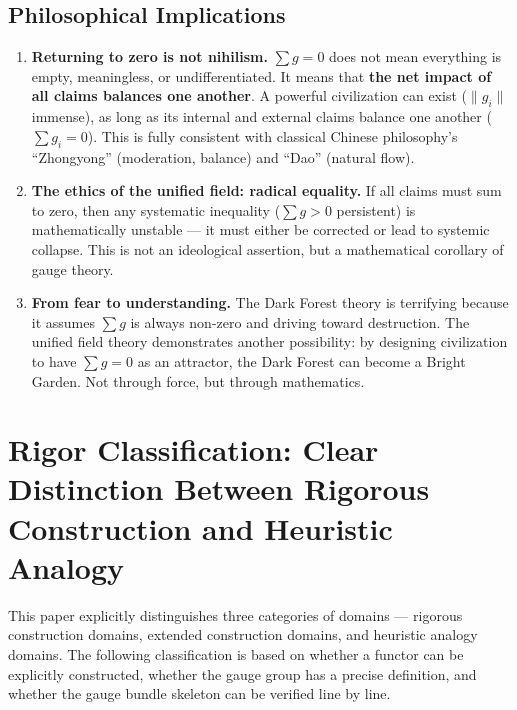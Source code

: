 \documentclass[12pt,a4paper]{article}
\theoremstyle{plain}
\theoremstyle{definition}
\begin{document}
\subsection{Philosophical Implications}

\begin{enumerate}[label=\textbf{Reflection \arabic*:}]

    \item \textbf{Returning to zero is not nihilism.} $\sum g = 0$ does not mean everything is empty,
    meaningless, or undifferentiated. It means that \textbf{the net impact of all claims balances one another}.
    A powerful civilization can exist ($\|g_i\|$ immense), as long as its internal and external
    claims balance one another ($\sum g_i = 0$). This is fully consistent with classical Chinese philosophy's
    ``Zhongyong'' (moderation, balance) and ``Dao'' (natural flow).

    \item \textbf{The ethics of the unified field: radical equality.} If all claims must
    sum to zero, then any systematic inequality ($\sum g > 0$ persistent) is mathematically
    unstable — it must either be corrected or lead to systemic collapse. This is not an ideological
    assertion, but a mathematical corollary of gauge theory.

    \item \textbf{From fear to understanding.} The Dark Forest theory is terrifying because
    it assumes $\sum g$ is always non-zero and driving toward destruction. The unified field theory demonstrates another
    possibility: by designing civilization to have $\sum g = 0$ as an attractor, the Dark Forest
    can become a Bright Garden. Not through force, but through mathematics.

\end{enumerate}

\newpage


\section{Rigor Classification: Clear Distinction Between Rigorous Construction and Heuristic Analogy}

This paper explicitly distinguishes three categories of domains — rigorous construction domains, extended construction domains, and heuristic analogy domains. The following classification is based on whether a functor can be explicitly constructed, whether the gauge group has a precise definition, and whether the gauge bundle skeleton can be verified line by line.
\end{document}
